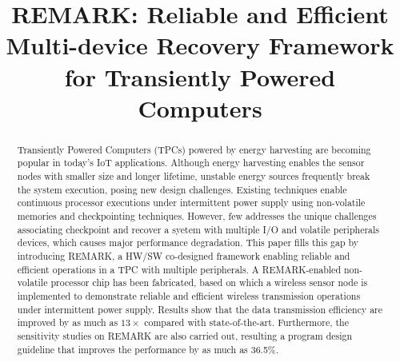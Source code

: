 \documentclass{sig-alternate}
\title{REMARK: Reliable and Efficient Multi-device Recovery Framework for Transiently Powered Computers}
\author{}
\begin{document}
\maketitle
\thispagestyle{firstpage}
\pagestyle{plain}

\begin{abstract}

Transiently Powered Computers (TPCs) powered by energy harvesting are becoming popular in today's IoT applications. Although energy harvesting enables the sensor nodes with smaller size and longer lifetime, unstable energy sources frequently break the system execution, posing new design challenges. Existing techniques enable continuous processor executions under intermittent power supply using non-volatile memories and checkpointing techniques. However, few addresses the unique challenges associating checkpoint and recover a syetem with multiple I/O and volatile peripherals devices, which causes major performance degradation. This paper fills this gap by introducing REMARK, a HW/SW co-designed framework enabling reliable and efficient operations in a TPC with multiple peripherals. A REMARK-enabled non-volatile processor chip has been fabricated, based on which a wireless sensor node is implemented to demonstrate reliable and efficient wireless transmission operations under intermittent power supply. Results show that the data transmission efficiency are improved by as much as $13\times$ compared with state-of-the-art. Furthermore, the sensitivity studies on REMARK are also carried out, resulting a program design guideline that improves the performance by as much as 36.5\%.

\end{abstract}















\end{document}

